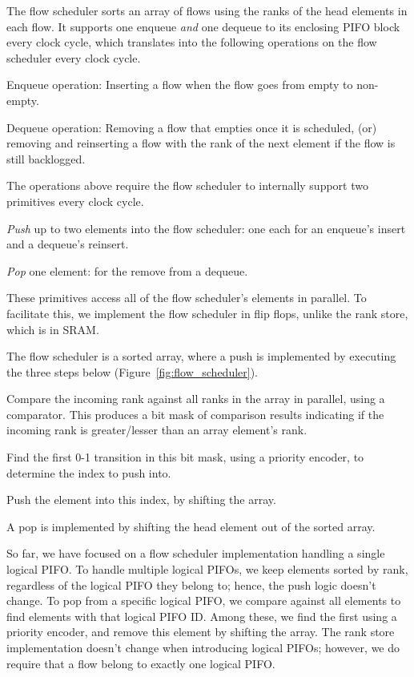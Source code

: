 The flow scheduler sorts an array of flows using the ranks of the head elements
in each flow. It supports one enqueue {\em and} one dequeue to its enclosing
PIFO block every clock cycle, which translates into the following operations on
the flow scheduler every clock cycle.
\begin{CompactEnumerate}
  \item Enqueue operation: Inserting a flow when the flow goes from empty to
  non-empty.
\item Dequeue operation: Removing a flow that empties once it is
  scheduled, (or) removing and reinserting a flow with the rank of the
  next element if the flow is still backlogged.
\end{CompactEnumerate}

The operations above require the flow scheduler to internally support two
primitives every clock cycle.
\begin{CompactEnumerate}
\item {\em Push} up to two elements into the flow scheduler: one each for an
  enqueue's insert and a dequeue's reinsert.
\item {\em Pop} one element: for the remove from a dequeue.
\end{CompactEnumerate}
These primitives access all of the flow scheduler's elements in parallel. To
facilitate this, we implement the flow scheduler in flip flops, unlike the rank
store, which is in SRAM.

The flow scheduler is a sorted array, where a push is implemented by executing the
three steps below (Figure~\ref{fig:flow_scheduler}).
\begin{CompactEnumerate}
\item Compare the incoming rank against all ranks in the array in parallel, using a comparator.
  This produces a bit mask of comparison results indicating if the incoming rank
  is greater/lesser than an array element's rank.
\item Find the first 0-1 transition in this bit mask, using a priority encoder,
  to determine the index to push into.
\item Push the element into this index, by shifting the array.
\end{CompactEnumerate}
A pop is implemented by shifting the head element out of the sorted array.

So far, we have focused on a flow scheduler implementation handling a single
logical PIFO. To handle multiple logical PIFOs, we keep elements sorted by
rank, regardless of the logical PIFO they belong to; hence, the push logic
doesn't change.  To pop from a specific logical PIFO, we compare against all elements to
find elements with that logical PIFO ID. Among these, we find the first
using a priority encoder, and remove this element by shifting the array. The
rank store implementation doesn't change when introducing logical PIFOs;
however, we do require that a flow belong to exactly one logical PIFO.

